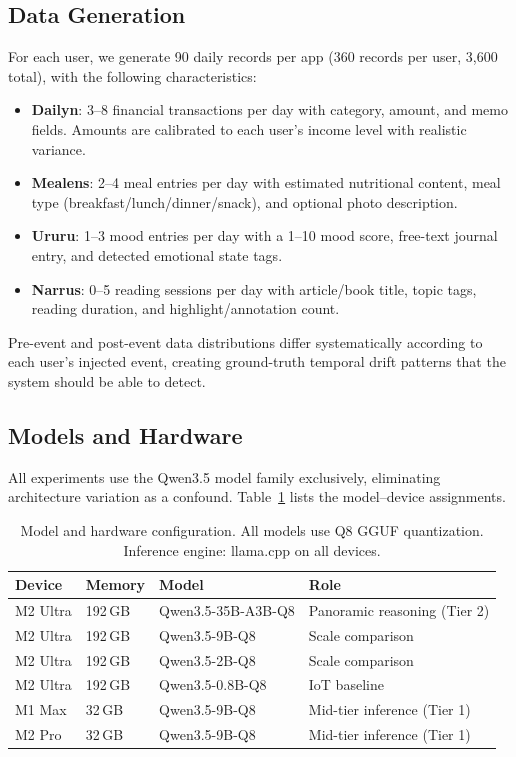 \documentclass[11pt,a4paper]{article}
\newcommand{\appname}[1]{\textsf{#1}}
\begin{document}
\subsection{Data Generation}

For each user, we generate 90 daily records per app (360 records per user,
3,600 total), with the following characteristics:

\begin{itemize}[leftmargin=*,itemsep=2pt]
  \item \textbf{\appname{Dailyn}}: 3--8 financial transactions per day with
    category, amount, and memo fields. Amounts are calibrated to each user's
    income level with realistic variance.
  \item \textbf{\appname{Mealens}}: 2--4 meal entries per day with estimated
    nutritional content, meal type (breakfast/lunch/dinner/snack), and
    optional photo description.
  \item \textbf{\appname{Ururu}}: 1--3 mood entries per day with a 1--10
    mood score, free-text journal entry, and detected emotional state tags.
  \item \textbf{\appname{Narrus}}: 0--5 reading sessions per day with
    article/book title, topic tags, reading duration, and highlight/annotation
    count.
\end{itemize}

Pre-event and post-event data distributions differ systematically according to
each user's injected event, creating ground-truth temporal drift patterns that
the system should be able to detect.

\subsection{Models and Hardware}

All experiments use the Qwen3.5 model family exclusively, eliminating
architecture variation as a confound. Table~\ref{tab:models} lists the
model--device assignments.

\begin{table}[H]
\centering
\caption{Model and hardware configuration. All models use Q8 GGUF quantization.
Inference engine: llama.cpp on all devices.}
\label{tab:models}
\begin{tabular}{@{}llll@{}}
\toprule
\textbf{Device} & \textbf{Memory} & \textbf{Model} & \textbf{Role} \\
\midrule
M2 Ultra & 192\,GB & Qwen3.5-35B-A3B-Q8 & Panoramic reasoning (Tier 2) \\
M2 Ultra & 192\,GB & Qwen3.5-9B-Q8      & Scale comparison \\
M2 Ultra & 192\,GB & Qwen3.5-2B-Q8      & Scale comparison \\
M2 Ultra & 192\,GB & Qwen3.5-0.8B-Q8    & IoT baseline \\
M1 Max   & 32\,GB  & Qwen3.5-9B-Q8      & Mid-tier inference (Tier 1) \\
M2 Pro   & 32\,GB  & Qwen3.5-9B-Q8      & Mid-tier inference (Tier 1) \\
\bottomrule
\end{tabular}
\end{table}
\end{document}
